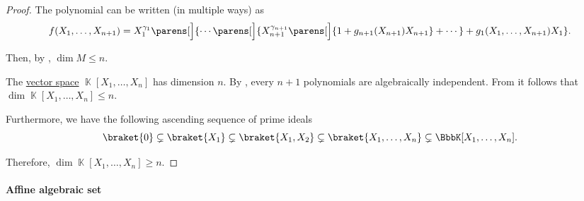 \begin{proof}
  The polynomial can be written (in multiple ways) as
  \begin{equation*}
    f(X_1, \ldots, X_{n+1}) = X_1^{\gamma_1} \parens[\Big]{ \cdots \parens[\Big]{ X_{n+1}^{\gamma_{n+1}} \parens[\Big]{ 1 + g_{n+1}(X_{n+1}) X_{n+1} } + \cdots } + g_1(X_1, \ldots, X_{n+1}) X_1 }.
  \end{equation*}

  Then, by , \( \dim M \leq n \).

   The \hyperref[def:vector_space]{vector space} \( \BbbK[X_1, \ldots, X_n] \) has dimension \( n \). By , every \( n + 1 \) polynomials are algebraically independent. From  it follows that \( \dim \BbbK[X_1, \ldots, X_n] \leq n \).

  Furthermore, we have the following ascending sequence of prime ideals
  \begin{equation*}
    \braket{ 0 } \subsetneq \braket{ X_1 } \subsetneq \braket{ X_1, X_2 } \subsetneq \braket{ X_1, \ldots, X_n } \subsetneq \BbbK[X_1, \ldots, X_n].
  \end{equation*}

  Therefore, \( \dim \BbbK[X_1, \ldots, X_n] \geq n \).
\end{proof}

\paragraph{Affine algebraic set}

